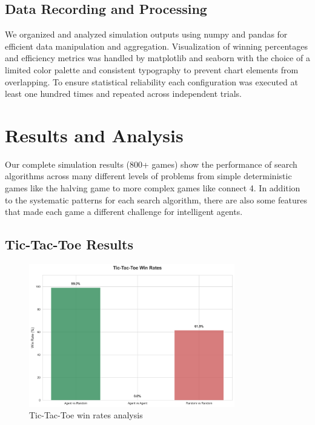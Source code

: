 \documentclass[12pt]{article}
\begin{document}
\subsection{Data Recording and Processing}

We organized and analyzed simulation outputs using numpy and pandas for efficient data manipulation and aggregation. Visualization of winning percentages and efficiency metrics was handled by matplotlib and seaborn with the choice of a limited color palette and consistent typography to prevent chart elements from overlapping. To ensure statistical reliability each configuration was executed at least one hundred times and repeated across independent trials.

\section{Results and Analysis}

Our complete simulation results (800+ games) show the performance of search algorithms across many different levels of problems from simple deterministic games like the halving game to more complex games like connect 4. In addition to the systematic patterns for each search algorithm, there are also some features that made each game a different challenge for intelligent agents.

\subsection{Tic-Tac-Toe Results}

\begin{figure}[H]
\centering
\includegraphics[width=0.8\textwidth]{output/images/tic_tac_toe_win_rates.png}
\caption{Tic-Tac-Toe win rates analysis}
\label{fig:tic_tac_toe_win_rates}
\end{figure}
\end{document}

